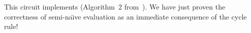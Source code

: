This circuit implements 
(Algorithm~2 from~\cite{greco-sldm15}).  We have just proven the
correctness of semi-na\"{\i}ve evaluation as an immediate consequence
of the cycle rule!



